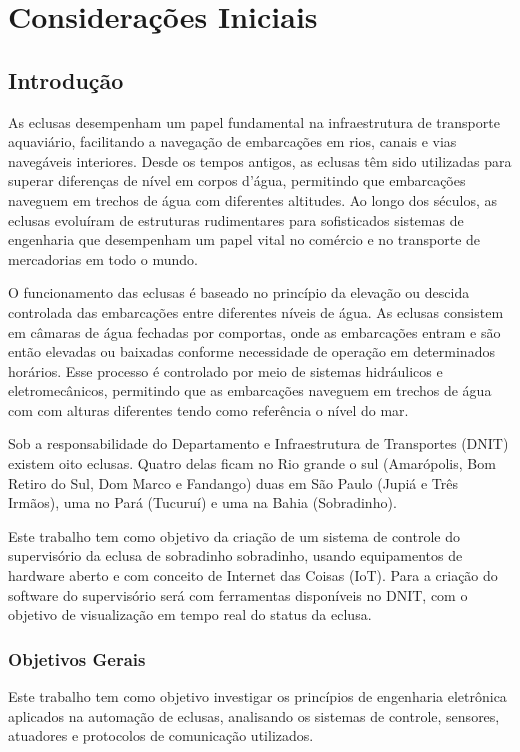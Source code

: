 \part{Considerações Iniciais}

\chapter[Introdução]{Introdução}
 
As eclusas desempenham um papel fundamental na infraestrutura de transporte aquaviário, facilitando a navegação de embarcações em rios, canais e vias navegáveis interiores. Desde os tempos antigos, as eclusas têm sido utilizadas para superar diferenças de nível em corpos d'água, permitindo que embarcações naveguem em trechos de água com diferentes altitudes. Ao longo dos séculos, as eclusas evoluíram de estruturas rudimentares para sofisticados sistemas de engenharia que desempenham um papel vital no comércio e no transporte de mercadorias em todo o mundo.

O funcionamento das eclusas é baseado no princípio da elevação ou descida controlada das embarcações entre diferentes níveis de água. As eclusas consistem em câmaras de água fechadas por comportas, onde as embarcações entram e são então elevadas ou baixadas conforme necessidade de operação em determinados horários. Esse processo é controlado por meio de sistemas hidráulicos e eletromecânicos, permitindo que as embarcações naveguem em trechos de água com com alturas diferentes tendo como referência o nível do mar.

Sob a responsabilidade do Departamento e Infraestrutura de Transportes (DNIT) existem oito eclusas. Quatro delas ficam no Rio grande o sul (Amarópolis, Bom Retiro do Sul, Dom Marco e Fandango) duas em São Paulo (Jupiá e Três Irmãos), uma no Pará (Tucuruí) e uma na Bahia (Sobradinho).

Este trabalho tem como objetivo da criação de um sistema de controle do supervisório da eclusa de sobradinho sobradinho, usando equipamentos de hardware aberto e com conceito de Internet das Coisas (IoT). Para a criação do software do supervisório será com ferramentas disponíveis no DNIT, com o objetivo de visualização em tempo real do status da eclusa.

\section{Objetivos Gerais}

Este trabalho tem como objetivo investigar os princípios de engenharia eletrônica aplicados na automação de eclusas, analisando os sistemas de controle, sensores, atuadores e protocolos de comunicação utilizados. 


